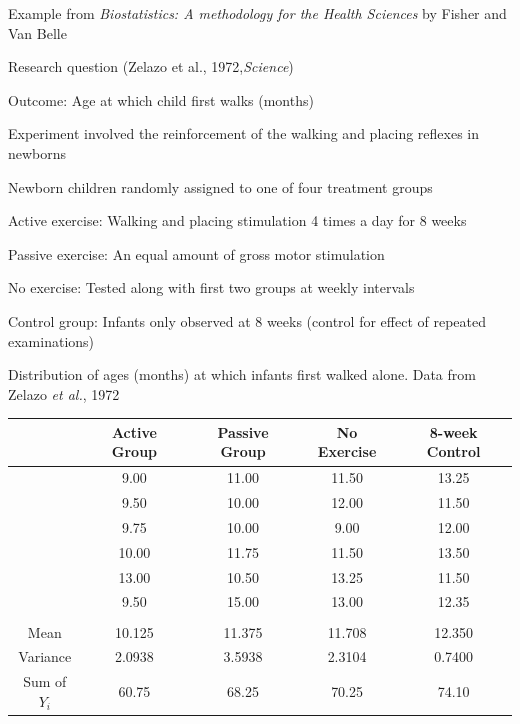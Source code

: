 \bi 
  \item Example from \textit{Biostatistics: A methodology for the Health Sciences} by Fisher and Van Belle
  \item Research question (Zelazo et al., 1972,\textit{Science})
    \bi
      \item Outcome: Age at which child first walks (months)
      \item Experiment involved the reinforcement of the walking and placing reflexes in newborns
      \item Newborn children randomly assigned to one of four treatment groups
      \bi 
        \item Active exercise: Walking and placing stimulation 4 times a day for 8 weeks
        \item Passive exercise: An equal amount of gross motor stimulation
        \item No exercise: Tested along with first two groups at weekly intervals
        \item Control group: Infants only observed at 8 weeks (control for effect of repeated examinations)
      \ei
    \ei
  \item Distribution of ages (months) at which infants first walked alone.  Data from Zelazo \textit{et al.}, 1972

\begin{center}
\begin{tabular}{ccccc} \hline
  & Active Group & Passive Group & No Exercise & 8-week Control \\ \hline
  & 9.00 & 11.00 & 11.50 & 13.25 \\ 
  & 9.50 & 10.00 & 12.00 & 11.50 \\ 
  & 9.75 & 10.00 &  9.00 & 12.00 \\ 
  & 10.00& 11.75 & 11.50 & 13.50 \\ 
  & 13.00& 10.50 & 13.25 & 11.50 \\ 
  & 9.50 & 15.00 & 13.00 & 12.35 \\ 
  &   &   &   &  \\
Mean & 10.125 & 11.375 & 11.708 & 12.350 \\ 
Variance & 2.0938 & 3.5938 & 2.3104 & 0.7400 \\ 
Sum of $Y_{i}$ & 60.75 & 68.25 & 70.25 & 74.10 \\ \hline
\end{tabular}
\end{center}

